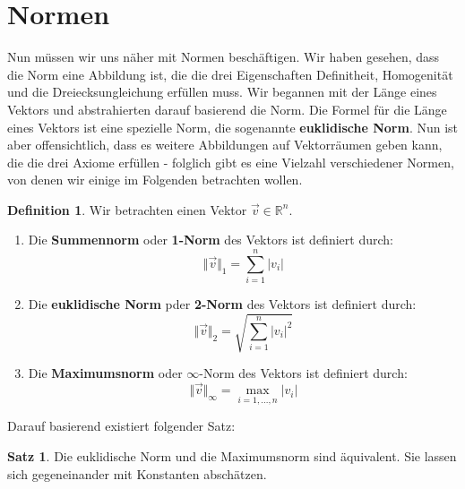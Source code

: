 \documentclass[11pt,a4paper]{scrartcl}
\theoremstyle{remark}
\theoremstyle{definition}
\newtheorem{definition}{Definition}[section]
\newtheorem{satz}{Satz}[section]
\begin{document}
\section{Normen}
Nun müssen wir uns näher mit Normen beschäftigen. Wir haben gesehen, dass die Norm eine Abbildung ist, die die drei Eigenschaften Definitheit, Homogenität und die Dreiecksungleichung erfüllen muss. Wir begannen mit der Länge eines Vektors und abstrahierten darauf basierend die Norm. Die Formel für die Länge eines Vektors ist eine spezielle Norm, die sogenannte \textbf{euklidische Norm}. Nun ist aber offensichtlich, dass es weitere Abbildungen auf Vektorräumen geben kann, die die drei Axiome erfüllen - folglich gibt es eine Vielzahl verschiedener Normen, von denen wir einige im Folgenden betrachten wollen.
\begin{definition} Wir betrachten einen Vektor $\vec{v} \in \mathbb{R}^n$.
\begin{enumerate}
\item Die \textbf{Summennorm} oder \textbf{1-Norm} des Vektors ist definiert durch: 
\[\Vert \vec{v} \Vert _{1} = \sum\limits_{i=1}^{n} \vert v_i \vert\]
\item Die \textbf{euklidische Norm} pder \textbf{2-Norm} des Vektors ist definiert durch:
\[\Vert \vec{v} \Vert _{2} = \sqrt{\sum\limits_{i=1}^{n} \vert v_i \vert ^{2}}\]
\item Die \textbf{Maximumsnorm} oder $\infty$-Norm des Vektors ist definiert durch:
\[\Vert \vec{v} \Vert _{\infty} = \max _{i=1, ..., n} \vert v_i \vert\]
\end{enumerate}
\end{definition}
Darauf basierend existiert folgender Satz:
\begin{satz}
Die euklidische Norm und die Maximumsnorm sind äquivalent. Sie lassen sich gegeneinander mit Konstanten abschätzen.
\end{satz}
\end{document}
